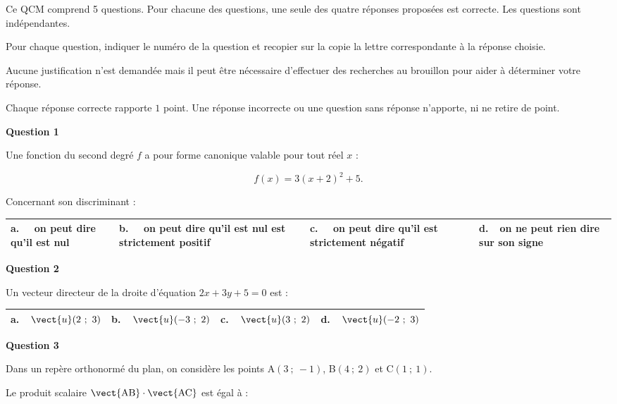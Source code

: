 \medskip

Ce QCM comprend 5 questions. Pour chacune des questions, une seule des quatre réponses proposées est correcte. Les questions sont indépendantes.

Pour chaque question, indiquer le numéro de la question et recopier sur la copie la lettre correspondante à la réponse choisie.

Aucune justification n'est demandée mais il peut être nécessaire d'effectuer des recherches au brouillon pour aider à déterminer votre réponse.

Chaque réponse correcte rapporte $1$ point. Une réponse incorrecte ou une question sans réponse n'apporte, ni ne retire de point.

\medskip

\textbf{Question 1}

Une fonction du second degré $f$ a pour forme canonique valable pour tout réel $x$ :

\[f(x) = 3(x + 2)^2 + 5.\]

Concernant son discriminant :

\begin{center}
\begin{tabularx}{\linewidth}{|*{4}{X|}}\hline
\textbf{a.~~} on peut dire qu'il est nul&\textbf{b.~~} on peut dire qu'il est nul est strictement
positif&\textbf{c.~~} on peut dire qu'il est strictement négatif&\textbf{d.~~}on ne peut rien dire sur son signe\\ \hline
\end{tabularx}
\end{center}

\textbf{Question 2}

Un vecteur directeur de la droite d'équation $2x + 3y + 5 = 0$ est : 

\begin{center}
\begin{tabularx}{\linewidth}{|*{4}{X|}}\hline
\textbf{a.~~}$\vect{u}(2~;~3)$&\textbf{b.~~}$\vect{u}(-3~;~2)$ &\textbf{c.~~}$\vect{u}(3~;~2)$&\textbf{d.~~}$\vect{u}(- 2~;~3)$\rule[-3mm]{0mm}{8mm}\\ \hline
\end{tabularx}
\end{center}

\textbf{Question 3}

Dans un repère orthonormé du plan, on considère les points A$(3~;~-1)$, B$(4~;~2)$ et C$(1~;~1)$.

Le produit scalaire $\vect{\text{AB}} \cdot \vect{\text{AC}}$ est égal à :

